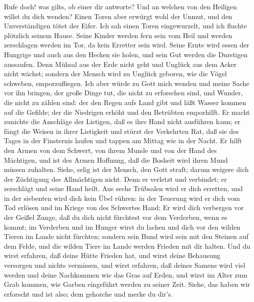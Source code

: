  Rufe doch! was gilts, ob einer dir antworte? Und an welchen
von den Heiligen willst du dich wenden?  Einen Toren aber
erwürgt wohl der Unmut, und den Unverständigen tötet der Eifer.
 Ich sah einen Toren eingewurzelt, und ich fluchte plötzlich
seinem Hause.  Seine Kinder werden fern sein vom Heil und
werden zerschlagen werden im Tor, da kein Erretter sein wird.
 Seine Ernte wird essen der Hungrige und auch aus den Hecken
sie holen, und sein Gut werden die Durstigen aussaufen. 
Denn Mühsal aus der Erde nicht geht und Unglück aus dem Acker nicht
wächst;  sondern der Mensch wird zu Unglück geboren, wie die
Vögel schweben, emporzufliegen.  Ich aber würde zu Gott mich
wenden und meine Sache vor ihn bringen,  der große Dinge
tut, die nicht zu erforschen sind, und Wunder, die nicht zu zählen sind:
 der den Regen aufs Land gibt und läßt Wasser kommen auf
die Gefilde;  der die Niedrigen erhöht und den Betrübten
emporhilft.  Er macht zunichte die Anschläge der Listigen,
daß es ihre Hand nicht ausführen kann;  er fängt die Weisen
in ihrer Listigkeit und stürzt der Verkehrten Rat,  daß sie
des Tages in der Finsternis laufen und tappen am Mittag wie in der
Nacht.  Er hilft den Armen von dem Schwert, von ihrem Munde
und von der Hand des Mächtigen,  und ist des Armen
Hoffnung, daß die Bosheit wird ihren Mund müssen zuhalten. 
Siehe, selig ist der Mensch, den Gott straft; darum weigere dich der
Züchtigung des Allmächtigen nicht.  Denn er verletzt und
verbindet; er zerschlägt und seine Hand heilt.  Aus sechs
Trübsalen wird er dich erretten, und in der siebenten wird dich kein
Übel rühren:  in der Teuerung wird er dich vom Tod erlösen
und im Kriege von des Schwertes Hand;  Er wird dich
verbergen vor der Geißel Zunge, daß du dich nicht fürchtest vor dem
Verderben, wenn es kommt;  im Verderben und im Hunger wirst
du lachen und dich vor den wilden Tieren im Lande nicht fürchten;
 sondern sein Bund wird sein mit den Steinen auf dem Felde,
und die wilden Tiere im Lande werden Frieden mit dir halten.
 Und du wirst erfahren, daß deine Hütte Frieden hat, und
wirst deine Behausung versorgen und nichts vermissen,  und
wirst erfahren, daß deines Samens wird viel werden und deine Nachkommen
wie das Gras auf Erden,  und wirst im Alter zum Grab
kommen, wie Garben eingeführt werden zu seiner Zeit. 
Siehe, das haben wir erforscht und ist also; dem gehorche und merke du
dir's.

